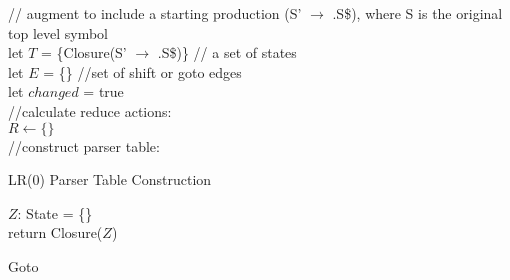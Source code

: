 \documentclass[8pt]{extarticle}
\begin{document}
\begin{multicols*}{2}
  \begin{algorithm}[H]
    // augment to include a starting production (S' $\rightarrow$ .S\$), where S is the original top level symbol\\
    let $T$ = \{Closure(S' $\rightarrow$ .S\$)\} // a set of states\\
    let $E$ = \{\} //set of shift or goto edges\\
    let $changed$ = true\\
    //calculate reduce actions:\\
    $R \leftarrow \{\}$\\
    //construct parser table:\\
    \caption{LR(0) Parser Table Construction\label{Algo_LR0ParserTable}}
  \end{algorithm}

  \begin{algorithm}[H]
    $Z$: State = \{\}\\
    return Closure($Z$)
    \caption{Goto\label{Algo_goto}}
  \end{algorithm}


\end{multicols*}
\end{document}
